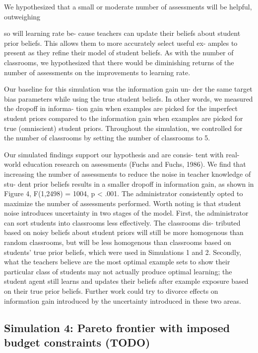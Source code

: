 \documentclass[10pt, letterpaper]{article}
\begin{document}
We hypothesized that a small or moderate number of assessments will be
helpful, outweighing

so will learning rate be- cause teachers can update their beliefs about
student prior beliefs. This allows them to more accurately select useful
ex- amples to present as they refine their model of student beliefs. As
with the number of classrooms, we hypothesized that there would be
diminishing returns of the number of assessments on the improvements to
learning rate.

Our baseline for this simulation was the information gain un- der the
same target bias parameters while using the true student beliefs. In
other words, we measured the dropoff in informa- tion gain when examples
are picked for the imperfect student priors compared to the information
gain when examples are picked for true (omniscient) student priors.
Throughout the simulation, we controlled for the number of classrooms by
setting the number of classrooms to 5.

Our simulated findings support our hypothesis and are consis- tent with
real-world education research on assessments (Fuchs and Fuchs, 1986). We
find that increasing the number of assessments to reduce the noise in
teacher knowledge of stu- dent prior beliefs results in a smaller
dropoff in information gain, as shown in Figure 4, F(1,2498) = 1004, p
\textless{} .001. The administrator consistently opted to maximize the
number of assessments performed. Worth noting is that student noise
introduces uncertainty in two stages of the model. First, the
administrator can sort students into classrooms less effectively. The
classrooms dis- tributed based on noisy beliefs about student priors
will still be more homogenous than random classrooms, but will be less
homogenous than classrooms based on students' true prior beliefs, which
were used in Simulations 1 and 2. Secondly, what the teachers believe
are the most optimal example sets to show their particular class of
students may not actually produce optimal learning; the student agent
still learns and updates their beliefs after example exposure based on
their true prior beliefs. Further work could try to divorce effects on
information gain introduced by the uncertainty introduced in these two
areas.

\subsection{Simulation 4: Pareto frontier with imposed budget
constraints
(TODO)}\label{simulation-4-pareto-frontier-with-imposed-budget-constraints-todo}
\end{document}
